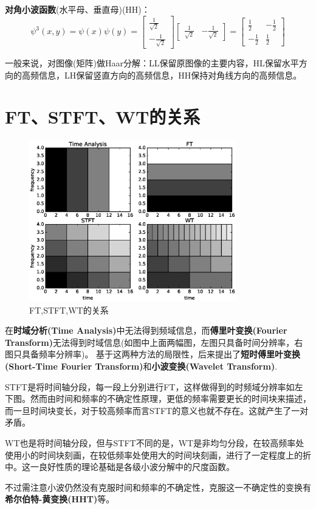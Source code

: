 \documentclass{article}
\begin{document}
\begin{CJK}{UTF8}{gbsn}
	\textbf{对角小波函数}(水平母、垂直母)(HH)：
	$$\psi^3(x,y)=\psi(x)\psi(y)=\begin{bmatrix}\frac{1}{\sqrt{2}}\\-\frac{1}{\sqrt{2}}\end{bmatrix}\begin{bmatrix}\frac{1}{\sqrt{2}}&-\frac{1}{\sqrt{2}}\end{bmatrix}=\begin{bmatrix}\frac{1}{2}&-\frac{1}{2}\\-\frac{1}{2}&\frac{1}{2}\end{bmatrix}$$\par
	一般来说，对图像(矩阵)做Haar分解：LL保留原图像的主要内容，HL保留水平方向的高频信息，LH保留竖直方向的高频信息，HH保持对角线方向的高频信息。\\

\section{FT、STFT、WT的关系}
\begin{figure}[H]
\centering
\includegraphics[height=7cm,width=9cm]{./figs/fig5.eps}
\caption{FT,STFT,WT的关系}
\label{5}
\end{figure}
	在\textbf{时域分析(Time Analysis)}中无法得到频域信息，而\textbf{傅里叶变换(Fourier Transform)}无法得到时域信息(如图中上面两幅图，左图只具备时间分辨率，右图只具备频率分辨率)。
	基于这两种方法的局限性，后来提出了\textbf{短时傅里叶变换(Short-Time Fourier Transform)}和\textbf{小波变换(Wavelet Transform)}.\par
	STFT是将时间轴分段，每一段上分别进行FT，这样做得到的时频域分辨率如左下图。然而由时间和频率的不确定性原理，更低的频率需要更长的时间块来描述，而一旦时间块变长，对于较高频率而言STFT的意义也就不存在。这就产生了一对矛盾。\par
	WT也是将时间轴分段，但与STFT不同的是，WT是非均匀分段，在较高频率处使用小的时间块刻画，在较低频率处使用大的时间块刻画，进行了一定程度上的折中。这一良好性质的理论基础是各级小波分解中的尺度函数。\par
	不过需注意小波仍然没有克服时间和频率的不确定性，克服这一不确定性的变换有\textbf{希尔伯特-黄变换(HHT)}等。\\



\end{CJK}
\end{document}
